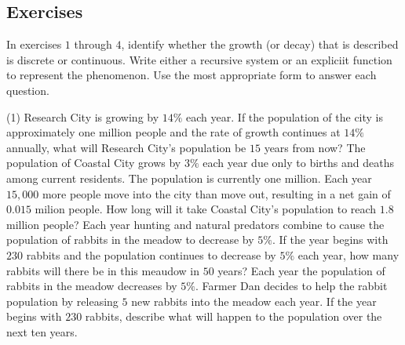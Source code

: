 \documentclass[10pt,]{book}
\theoremstyle{plain}
\theoremstyle{definition}
\theoremstyle{definition}
\theoremstyle{definition}
\numberwithin{equation}{section}
\begin{document}
\subsection[{Exercises}]{Exercises}\label{exercises-5}
\hypertarget{exercisegroup-1}{}\par\noindent In exercises \(1\) through \(4\), identify whether the growth (or decay) that is described is discrete or continuous.  Write either a recursive system or an expliciit function to represent the phenomenon. Use the most appropriate form to answer each question.%
\begin{exercisegroup}(1)
\exercise[1.]\hypertarget{exercise-20}{}Research City is growing by \(14\%\) each year.  If the population of the city is approximately one million people and the rate of growth continues at \(14\%\) annually, what will Research City's population be \(15\) years from now?%
\exercise[2.]\hypertarget{exercise-21}{}The population of Coastal City grows by \(3\%\) each year due only to births and deaths among current residents.  The population is currently one million.  Each year \(15,000\) more people move into the city than move out, resulting in a net gain of \(0.015\) milion people. How long will it take Coastal City's population to reach \(1.8\) million people?%
\exercise[3.]\hypertarget{exercise-22}{}Each year hunting and natural predators combine to cause the population of rabbits in the meadow to decrease by \(5\%\).  If the year begins with \(230\) rabbits and the population continues to decrease by \(5\%\) each year, how many rabbits will there be in this meaudow in \(50\) years?%
\exercise[4.]\hypertarget{exercise-23}{}Each year the population of rabbits in the meadow decreases by \(5\%\).  Farmer Dan decides to help the rabbit population by releasing \(5\) new rabbits into the meadow each year.  If the year begins with \(230\) rabbits, describe what will happen to the population over the next ten years.%
\end{exercisegroup}
\par\smallskip\noindent
\end{document}
